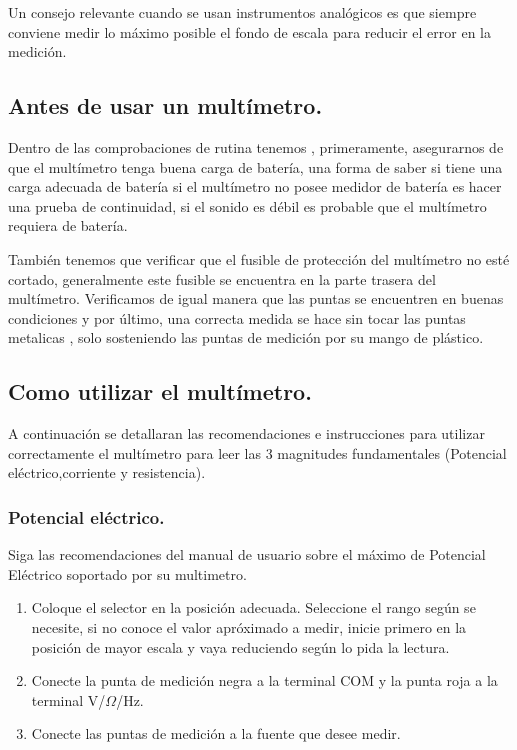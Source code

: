 \documentclass[10pt]{article}
\begin{document}
\begin{multicols}{2}
Un consejo relevante cuando se usan instrumentos analógicos es que siempre conviene medir lo máximo posible el fondo de escala para reducir el error en la medición.

\subsection{Antes de usar un multímetro.}
Dentro de las comprobaciones de rutina tenemos , primeramente, asegurarnos de que el multímetro tenga buena carga de batería, una forma de saber si tiene una carga adecuada de batería si el multímetro no posee medidor de batería es hacer una prueba de continuidad, si el sonido
es débil es probable que el multímetro requiera de batería.

También tenemos que verificar que el fusible de protección del multímetro no esté cortado, generalmente este fusible se encuentra en la parte trasera del multímetro. Verificamos de igual manera que las puntas se encuentren en buenas condiciones y por último, una correcta medida se hace
sin tocar las puntas metalicas , solo sosteniendo las puntas de medición por su mango de plástico.

\subsection{Como utilizar el multímetro.}

A continuación se detallaran las recomendaciones e instrucciones para utilizar correctamente el multímetro para leer las 3 magnitudes fundamentales (Potencial eléctrico,corriente y resistencia).
\subsubsection{Potencial eléctrico.}

Siga las recomendaciones del manual de usuario sobre el máximo de Potencial Eléctrico soportado por su multimetro.
\begin{enumerate}
	\item Coloque el selector en la posición adecuada. Seleccione el rango según se necesite, si no conoce el valor apróximado a medir, inicie primero en la posición de mayor escala y vaya reduciendo según lo pida la lectura.
	\item Conecte la punta de medición negra a la terminal COM y la punta roja a la terminal V/$\Omega$/Hz.
	\item Conecte las puntas de medición a la fuente que desee medir.
\end{enumerate}


\end{multicols}
\end{document}
